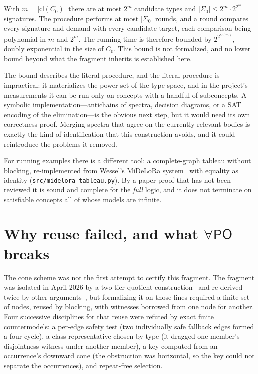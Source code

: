 \documentclass[11pt]{article}
\newcommand{\PO}{\mathsf{PO}}
\newcommand{\cl}{\mathsf{cl}}
\theoremstyle{plain}
\theoremstyle{definition}
\begin{document}
With $m=|\cl(C_0)|$ there are at most $2^m$ candidate types and
$|\Sigma_0|\le 2^m\cdot 2^{2^m}$ signatures. The procedure performs at most
$|\Sigma_0|$ rounds, and a round compares every signature and demand with every
candidate target, each comparison being polynomial in $m$ and $2^m$. The running
time is therefore bounded by $2^{2^{O(m)}}$, doubly exponential in the size of
$C_0$. This bound is not formalized, and no lower bound beyond what the fragment
inherits is established here.

The bound describes the literal procedure, and the literal procedure is
impractical: it materializes the power set of the type space, and in the project's
measurements it can be run only on concepts with a handful of subconcepts. A
symbolic implementation---antichains of spectra, decision diagrams, or a SAT
encoding of the elimination---is the obvious next step, but it would need its
own correctness proof. Merging spectra that agree on the currently relevant
bodies is exactly the kind of identification that this construction avoids,
and it could reintroduce the problems it removed.

For running examples there is a different tool: a complete-graph tableau
without blocking, re-implemented from Wessel's MiDeLoRa
system~\cite{Wessel2008} with equality as identity
(\texttt{src/midelora\_tableau.py}). By a paper proof that has not been
reviewed it is sound and complete for the \emph{full} logic, and it does not
terminate on satisfiable concepts all of whose models are infinite.

\section{Why reuse failed, and what \texorpdfstring{$\forall\PO$}{forall-PO} breaks}
\label{sec:reflection}

The cone scheme was not the first attempt to certify this fragment. The
fragment was isolated in April 2026 by a two-tier quotient
construction~\cite{TwoTierQuotient} and re-derived twice by other
arguments~\cite{Overview}, but formalizing it on those lines required a finite
set of nodes, reused by blocking, with witnesses borrowed from one node for
another. Four successive disciplines for that reuse were refuted by exact finite
countermodels: a per-edge safety test (two individually safe fallback edges
formed a four-cycle), a class representative chosen by type (it dragged one
member's disjointness witness under another member), a key computed from an
occurrence's downward cone (the obstruction was horizontal, so the key could not
separate the occurrences), and repeat-free selection.
\end{document}

